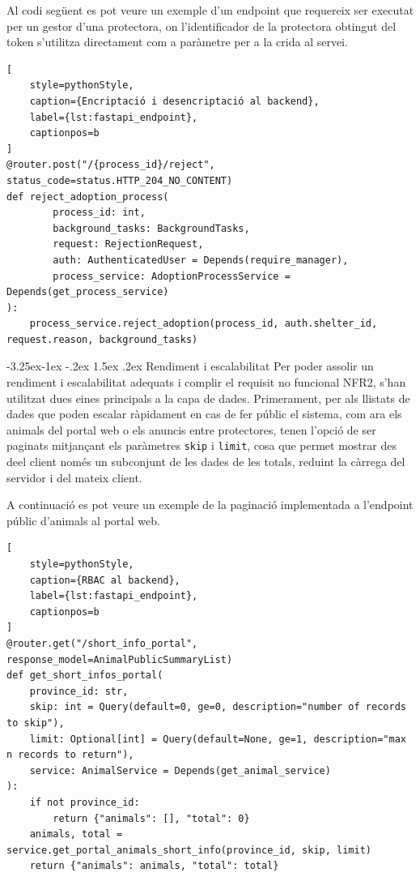 \documentclass[11pt,a4paper]{report}
\makeatletter
\renewcommand\paragraph{\@startsection{paragraph}{4}{\z@}%
    {-3.25ex\@plus -1ex \@minus -.2ex}%
    {1.5ex \@plus .2ex}
    {\normalfont\normalsize\bfseries}}
\makeatother
\begin{document}
Al codi següent es pot veure un exemple d'un endpoint que requereix ser executat per un gestor d'una protectora, on l'identificador de la protectora obtingut del token s'utilitza directament com a paràmetre per a la crida al servei.
\begin{lstlisting}[
    style=pythonStyle,
    caption={Encriptació i desencriptació al backend},
    label={lst:fastapi_endpoint},
    captionpos=b
]
@router.post("/{process_id}/reject", status_code=status.HTTP_204_NO_CONTENT)
def reject_adoption_process(
        process_id: int,
        background_tasks: BackgroundTasks,
        request: RejectionRequest,
        auth: AuthenticatedUser = Depends(require_manager),
        process_service: AdoptionProcessService = Depends(get_process_service)
):
    process_service.reject_adoption(process_id, auth.shelter_id, request.reason, background_tasks)
\end{lstlisting}
\paragraph{Rendiment i escalabilitat}
Per poder assolir un rendiment i escalabilitat adequats i complir el requisit no funcional NFR2, s'han utilitzat dues eines principals a la capa de dades. Primerament, per als llistats de dades que poden escalar ràpidament en cas de fer públic el sistema, com ara els animals del portal web o els anuncis entre protectores, tenen l'opció de ser paginats mitjançant els paràmetres \texttt{skip} i \texttt{limit}, cosa que permet mostrar des deel client només un subconjunt de les dades de les totals, reduint la càrrega del servidor i del mateix client.

A continuació es pot veure un exemple de la paginació implementada a l'endpoint públic d'animals al portal web.
\begin{lstlisting}[
    style=pythonStyle,
    caption={RBAC al backend},
    label={lst:fastapi_endpoint},
    captionpos=b
]
@router.get("/short_info_portal", response_model=AnimalPublicSummaryList)
def get_short_infos_portal(
    province_id: str,
    skip: int = Query(default=0, ge=0, description="number of records to skip"),
    limit: Optional[int] = Query(default=None, ge=1, description="max n records to return"),
    service: AnimalService = Depends(get_animal_service)
):
    if not province_id:
        return {"animals": [], "total": 0}
    animals, total = service.get_portal_animals_short_info(province_id, skip, limit)
    return {"animals": animals, "total": total}
\end{lstlisting}
\end{document}
